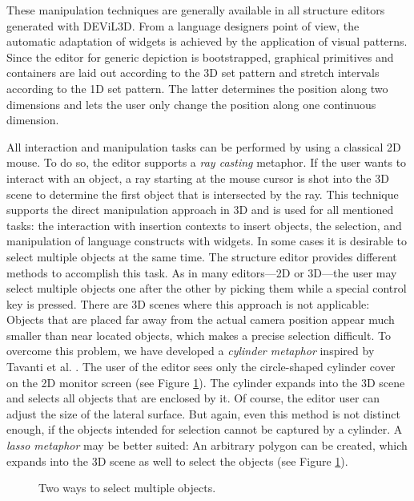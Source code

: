 \documentclass[a4paper]{article}
\newcommand{\dev}{DEViL3D\xspace}
\begin{document}
These manipulation techniques are generally available in all structure editors generated with \dev. From a language designers point of view, the automatic adaptation of widgets is achieved by the application of visual patterns. Since the editor for generic depiction is bootstrapped, graphical primitives and containers are laid out according to the 3D set pattern and stretch intervals according to the 1D set pattern. The latter determines the position along two dimensions and lets the user only change the position along one continuous dimension.

All interaction and manipulation tasks can be performed by using a classical 2D mouse. To do so, the editor supports a \emph{ray casting} metaphor. If the user wants to interact with an object, a ray starting at the mouse cursor is shot into the 3D scene to determine the first object that is intersected by the ray. This technique supports the direct manipulation approach in 3D and is used for all mentioned tasks: the interaction with insertion contexts to insert objects, the selection, and manipulation of language constructs with widgets. In some cases it is desirable to select multiple objects at the same time. The structure editor provides different methods to accomplish this task. As in many editors---2D or 3D---the user may select multiple objects one after the other by picking them while a special control key is pressed. There are 3D scenes where this approach is not applicable: Objects that are placed far away from the actual camera position appear much smaller than near located objects, which makes a precise selection difficult. To overcome this problem, we have developed a \emph{cylinder metaphor} inspired by Tavanti et al. \cite{TDL04}. The user of the editor sees only the circle-shaped cylinder cover on the 2D monitor screen (see Figure \ref{fig:multSelection}). The cylinder expands into the 3D scene and selects all objects that are enclosed by it. Of course, the editor user can adjust the size of the lateral surface. But again, even this method is not distinct enough, if the objects intended for selection cannot be captured by a cylinder. A \emph{lasso metaphor} may be better suited: An arbitrary polygon can be created, which expands into the 3D scene as well to select the objects (see Figure \ref{fig:multSelection}).

\begin{figure}[!ht]
\begin{center}
  \hfil
 \end{center}
\caption{Two ways to select multiple objects.}
\label{fig:multSelection}
\end{figure}
\end{document}
